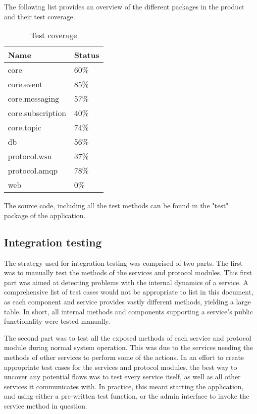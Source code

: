 The following list provides an overview of the different packages in the product and their test coverage.


\begin{center}
\begin{table}[ht!]
\small
\centering
\begin{tabular}{|p{5cm}|p{2cm}|}
\hline
\rowcolor{lightgray}
\textbf{Name} & \textbf{Status} \\
\hline
 core & 60\%  \\
 core.event & 85\% \\ 
 core.messaging & 57\% \\ 
 core.subscription & 40\% \\ 
 core.topic & 74\% \\
 db & 56\% \\
 protocol.wsn & 37\% \\
 protocol.amqp & 78\% \\
 web & 0\% \\
\hline
\end{tabular}
\caption{Test coverage}
\label{tab:test coverage}
\end{table}
\end{center}





The source code, including all the test methods can be found in the "test" package of the application.

\subsection{Integration testing}
\label{subsec:testing-test_execution-integration_testing}

The strategy used for integration testing was comprised of two parts. The first was to manually test the methods of the services and protocol modules. This first part was aimed at detecting problems with the internal dynamics of a service. A comprehensive list of test cases would not be appropriate to list in this document, as each component and service provides vastly different methods, yielding a large table. In short, all internal methods and components supporting a service's public functionality were tested manually.

The second part was to test all the exposed methods of each service and protocol module during normal system operation. This was due to the services needing the methods of other services to perform some of the actions. In an effort to create appropriate test cases for the services and protocol modules, the best way to uncover any potential flaws was to test every service itself, as well as all other services it communicates with. In practice, this meant starting the application, and using either a pre-written test function, or the admin interface to invoke the service method in question.

